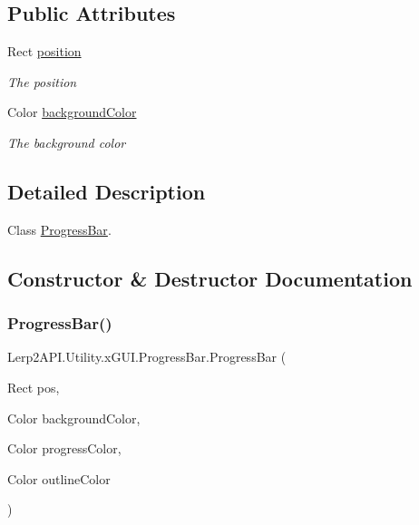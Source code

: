 \subsection*{Public Attributes}
\begin{DoxyCompactItemize}
\item 
Rect \hyperlink{class_lerp2_a_p_i_1_1_utility_1_1x_g_u_i_1_1_progress_bar_aa5f866590507139c90f4a87486d4912c}{position}
\begin{DoxyCompactList}\small\item\em The position \end{DoxyCompactList}\item 
Color \hyperlink{class_lerp2_a_p_i_1_1_utility_1_1x_g_u_i_1_1_progress_bar_a8c9f8f47d4ad863cb7811cfe59387bab}{background\+Color}
\begin{DoxyCompactList}\small\item\em The background color \end{DoxyCompactList}\end{DoxyCompactItemize}


\subsection{Detailed Description}
Class \hyperlink{class_lerp2_a_p_i_1_1_utility_1_1x_g_u_i_1_1_progress_bar}{Progress\+Bar}. 



\subsection{Constructor \& Destructor Documentation}
\mbox{\label{class_lerp2_a_p_i_1_1_utility_1_1x_g_u_i_1_1_progress_bar_a9333d50d1421df81e926ece7820b9992}} 
\subsubsection{\texorpdfstring{Progress\+Bar()}{ProgressBar()}\hspace{0.1cm}{\footnotesize\ttfamily [1/2]}}
{\footnotesize\ttfamily Lerp2\+A\+P\+I.\+Utility.\+x\+G\+U\+I.\+Progress\+Bar.\+Progress\+Bar (\begin{DoxyParamCaption}\item[{Rect}]{pos,  }\item[{Color}]{background\+Color,  }\item[{Color}]{progress\+Color,  }\item[{Color}]{outline\+Color }\end{DoxyParamCaption})\hspace{0.3cm}{\ttfamily [inline]}}



